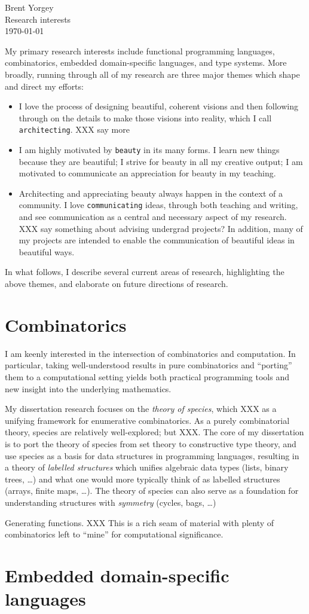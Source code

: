 \documentclass{article}
\begin{document}
\noindent Brent Yorgey \\
Research interests \\
\today
\bigskip

My primary research interests include functional programming
languages, combinatorics, embedded domain-specific languages, and type
systems.  More broadly, running through all of my research are three
major themes which shape and direct my efforts:

\begin{itemize}
\item I love the process
  of designing beautiful, coherent visions and then following through on
  the details to make those visions into reality, which I call \texttt{architecting}.  XXX say more
\item I am highly motivated by \texttt{beauty} in its many forms.  I
  learn new things because they are beautiful; I strive for beauty in
  all my creative output; I am motivated to communicate an
  appreciation for beauty in my teaching.
\item Architecting and appreciating beauty always happen in the
  context of a community.  I love \texttt{communicating} ideas,
  through both teaching and writing, and see communication as a
  central and necessary aspect of my research. XXX say something about
  advising undergrad projects?  In addition, many of my projects are
  intended to enable the communication of beautiful ideas in beautiful
  ways.
\end{itemize}

In what follows, I describe several current areas of research,
highlighting the above themes, and elaborate on future directions of
research.

\section*{Combinatorics}
\label{sec:combinatorics}

I am keenly interested in the intersection of combinatorics and
computation.  In particular, taking well-understood results in pure
combinatorics and ``porting'' them to a computational setting yields
both practical programming tools and new insight into the underlying
mathematics.

My dissertation research focuses on the \emph{theory of species},
which XXX as a unifying framework for enumerative combinatorics.  As a
purely combinatorial theory, species are relatively well-explored; but
XXX.  The core of my dissertation is to port the theory of species
from set theory to constructive type theory, and use species as a
basis for data structures in programming languages, resulting in a
theory of \emph{labelled structures} which unifies algebraic data
types (lists, binary trees, \dots) and what one would more typically
think of as labelled structures (arrays, finite maps, \dots).  The
theory of species can also serve as a foundation for understanding
structures with \emph{symmetry} (cycles, bags, \dots)

Generating functions. XXX This is a rich seam of material with plenty
of combinatorics left to ``mine'' for computational significance.

\section{Embedded domain-specific languages}
\label{sec:edsls}
\end{document}
